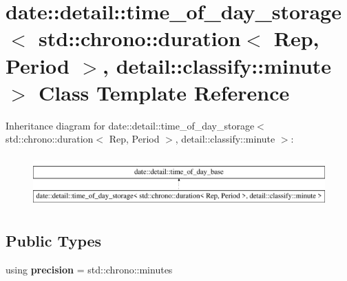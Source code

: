 \hypertarget{classdate_1_1detail_1_1time__of__day__storage_3_01std_1_1chrono_1_1duration_3_01_rep_00_01_perio2f7e02f06472a83980e1d0196ea2746d}{}\section{date\+::detail\+::time\+\_\+of\+\_\+day\+\_\+storage$<$ std\+::chrono\+::duration$<$ Rep, Period $>$, detail\+::classify\+::minute $>$ Class Template Reference}
\label{classdate_1_1detail_1_1time__of__day__storage_3_01std_1_1chrono_1_1duration_3_01_rep_00_01_perio2f7e02f06472a83980e1d0196ea2746d}
Inheritance diagram for date\+::detail\+::time\+\_\+of\+\_\+day\+\_\+storage$<$ std\+::chrono\+::duration$<$ Rep, Period $>$, detail\+::classify\+::minute $>$\+:\begin{figure}[H]
\begin{center}
\leavevmode
\includegraphics[height=1.989343cm]{classdate_1_1detail_1_1time__of__day__storage_3_01std_1_1chrono_1_1duration_3_01_rep_00_01_perio2f7e02f06472a83980e1d0196ea2746d}
\end{center}
\end{figure}
\subsection*{Public Types}
\begin{DoxyCompactItemize}
\item 
\mbox{\label{classdate_1_1detail_1_1time__of__day__storage_3_01std_1_1chrono_1_1duration_3_01_rep_00_01_perio2f7e02f06472a83980e1d0196ea2746d_a0584cc5f06b4226f2af3f8be8ba1c5c7}} 
using {\bfseries precision} = std\+::chrono\+::minutes
\end{DoxyCompactItemize}
